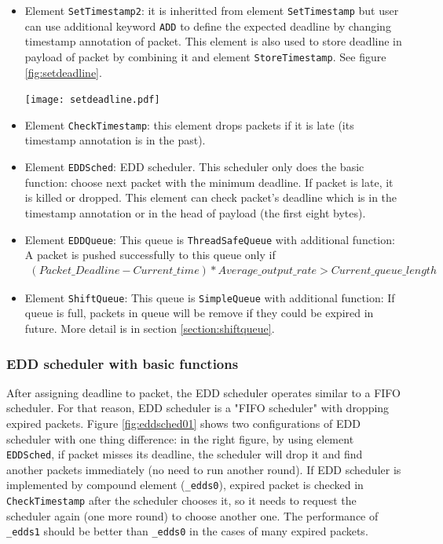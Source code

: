 \documentclass[a4paper]{article}
\begin{document}
  \begin{itemize}
  	\item Element \texttt{SetTimestamp2}: it is inheritted from element \texttt{SetTimestamp} but user can use additional keyword \texttt{ADD} to define the expected deadline by changing timestamp annotation of packet. This element is also used to store deadline in payload of packet by combining it and element \texttt{StoreTimestamp}. See figure \ref{fig:setdeadline}.
        \begin{center}
	      \texttt{[image: setdeadline.pdf]}
	      \label{fig:setdeadline}
        \end{center}

  	\item Element \texttt{CheckTimestamp}: this element drops packets if it is late (its timestamp annotation is in the past).
  	\item Element \texttt{EDDSched}: EDD scheduler. This scheduler only does the basic function: choose next packet with the minimum deadline. If packet is late, it is killed or dropped. This element can check packet's deadline which is in the timestamp annotation or in the head of payload (the first eight bytes).
  	\item Element \texttt{EDDQueue}: This queue is \texttt{ThreadSafeQueue} with additional function: A packet is pushed successfully to this queue only if
  	\begin{align*}
  	(Packet\_Deadline - Current\_time) * Average\_output\_rate > Current\_queue\_length
  	\end{align*}
  	\item Element \texttt{ShiftQueue}: This queue is \texttt{SimpleQueue} with additional function: If queue is full, packets in queue will be remove if they could be expired in future. More detail is in section \ref{section:shiftqueue}. 
  \end{itemize}
  
  \subsubsection{EDD scheduler with basic functions} \label{section:eddbasic}
  After assigning deadline to packet, the EDD scheduler operates similar to a FIFO scheduler. For that reason, EDD scheduler is a "FIFO scheduler" with dropping expired packets. Figure \ref{fig:eddsched01} shows two configurations of EDD scheduler with one thing difference: in the right figure, by using element \texttt{EDDSched}, if packet misses its deadline, the scheduler will drop it and find another packets immediately (no need to run another round). If EDD scheduler is implemented by compound element (\texttt{\_edds0}), expired packet is checked in \texttt{CheckTimestamp} after the scheduler chooses it, so it needs to request the scheduler again (one more round) to choose another one. The performance of \texttt{\_edds1} should be better than \texttt{\_edds0} in the cases of many expired packets.
  
\end{document}
